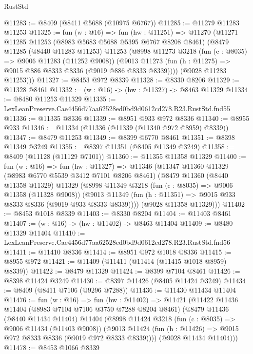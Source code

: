 \begin{lexlean}{RustStd}
\begin{coremodule}
@11283 := @8409 (@8411 @5688 (@10975 @6767))
@11285 := @11279 @11283 @11253
@11325 := fun (w : @16) =>
  fun (hw : @11251) =>
  @11270
    (@11271
      @11285
      @11253
      (@8983 @5683 @5688 @5395 @6767 @8208 @8461)
      (@8479
        @11285
        (@8440 @11283 @11253)
        @11253
        (@8998
          @11273
          @3218
          (fun (c : @8035) => @9006 @11283 (@11252 @9008))
          (@9013 @11273 (fun (h : @11275) => @9015 @886 @8333 @8336 (@9019 @886 @8333 @8339))))
        (@9028 @11283 @11253)))
@11327 := @8453 @972 @8339
@11328 := @8330 @8206
@11329 := @11328 @8461
@11332 := (w : @16) -> (hw : @11327) -> @8463 @11329
@11334 := @8480 @11253 @11329
@11335 := LexLeanPreserve.Cae4456d77aa62528ed0bd9d0612cd278.R23.RustStd.fnd55
@11336 := @11335 @8336
@11339 := @8951 @933 @972 @8336
@11340 := @8955 @933
@11346 := @11334 (@11336 (@11339 (@11340 @972 @8959) @8339))
@11347 := @8479 @11253
@11349 := @8399 @6770 @8461
@11351 := @8398 @11349 @3249
@11355 := @8397 @11351 (@8405 @11349 @3249)
@11358 := @8409 (@11128 (@11129 @7101))
@11360 := @11355 @11358 @11329
@11400 := fun (w : @16) =>
  fun (hw : @11327) =>
  @11346
    (@11347
      @11360
      @11329
      (@8983 @6770 @5539 @3412 @7101 @8206 @8461)
      (@8479
        @11360
        (@8440 @11358 @11329)
        @11329
        (@8998
          @11349
          @3218
          (fun (c : @8035) => @9006 @11358 (@11328 @9008))
          (@9013 @11349 (fun (h : @11351) => @9015 @933 @8333 @8336 (@9019 @933 @8333 @8339))))
        (@9028 @11358 @11329)))
@11402 := @8453 @1018 @8339
@11403 := @8330 @8204
@11404 := @11403 @8461
@11407 := (w : @16) -> (hw : @11402) -> @8463 @11404
@11409 := @8480 @11329 @11404
@11410 := LexLeanPreserve.Cae4456d77aa62528ed0bd9d0612cd278.R23.RustStd.fnd56
@11411 := @11410 @8336
@11414 := @8951 @972 @1018 @8336
@11415 := @8955 @972
@11421 := @11409 (@11411 (@11414 (@11415 @1018 @8959) @8339))
@11422 := @8479 @11329
@11424 := @8399 @7104 @8461
@11426 := @8398 @11424 @3249
@11430 := @8397 @11426 (@8405 @11424 @3249)
@11434 := @8409 (@8411 @7106 (@9296 @7288))
@11436 := @11430 @11434 @11404
@11476 := fun (w : @16) =>
  fun (hw : @11402) =>
  @11421
    (@11422
      @11436
      @11404
      (@8983 @7104 @7106 @3750 @7288 @8204 @8461)
      (@8479
        @11436
        (@8440 @11434 @11404)
        @11404
        (@8998
          @11424
          @3218
          (fun (c : @8035) => @9006 @11434 (@11403 @9008))
          (@9013 @11424 (fun (h : @11426) => @9015 @972 @8333 @8336 (@9019 @972 @8333 @8339))))
        (@9028 @11434 @11404)))
@11478 := @8453 @1066 @8339

\end{coremodule}
\end{lexlean}
